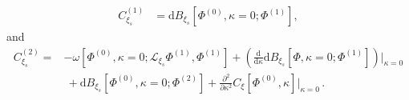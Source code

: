 \documentclass[]{jkpaper}
\theoremstyle{plain}
\theoremstyle{definition}
\newcommand{\sd}{\mathrm {d}}
\def\extd{\mathrm {d}}
\newcommand{\sL}{\mathcal{L}}
\begin{document}
\begin{equation}\begin{split}\label{eq: first order constraint, diffeo with sym app}
     C_{\xi_s}^{(1)}
     &= \sd B_{\xi_s}\left[\Phi^{(0)},\kappa=0; \Phi^{(1)}\right],
\end{split}\end{equation}
and
\begin{equation}\begin{split}\label{eq: second order constraint, diffeo with sym app}
     C_{\xi_s}^{(2)}
      =&-\omega\left[\Phi^{(0)},\kappa=0;\sL_{\xi_s}\Phi^{(1)},\Phi^{(1)}\right]
      +\left(\frac{\extd}{\extd\kappa}\sd B_{\xi_s}\left[\Phi,\kappa=0;\Phi^{(1)}\right]
      \right)\bigg|_{\kappa=0}\\
      &~
      +\sd B_{\xi_s}\left[\Phi^{(0)},\kappa=0;\Phi^{(2)}\right]
      +\frac{\partial^2}{\partial\kappa^2}C_\xi[\Phi^{(0)},\kappa]\bigg|_{\kappa=0}\,.
\end{split}\end{equation}
\end{document}
